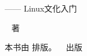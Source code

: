 \thispagestyle{empty}
\makeatletter

\begin{center}


{\fontsize{2cm}{2.5cm}\selectfont \xingkai{} \@title

 \vskip 2cm
 
\normalfont  \large  ------ Linux文化入门 
 
 }


\vskip 5cm

 {\LARGE
  \@author ~ 著 }


\end{center}

\null
\vfill


\begin{flushright}
本书由 \XeLaTeX{} 排版。 \hfill \@publisher ~ 出版
\end{flushright}

\makeatother